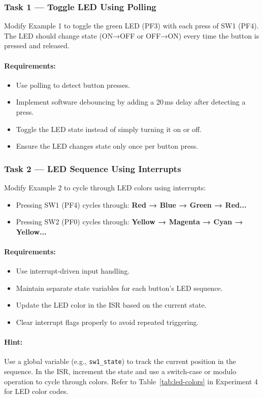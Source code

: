 \subsubsection{Task 1 — Toggle LED Using Polling}

Modify Example 1 to toggle the green LED (PF3) with each press of SW1 (PF4). The LED should change state (ON→OFF or OFF→ON) every time the button is pressed and released.

\paragraph{Requirements:}
\begin{itemize}[nosep]
  \item Use polling to detect button presses.
  \item Implement software debouncing by adding a 20\,ms delay after detecting a press.
  \item Toggle the LED state instead of simply turning it on or off.
  \item Ensure the LED changes state only once per button press.
\end{itemize}

\medskip


\subsubsection{Task 2 — LED Sequence Using Interrupts}

Modify Example 2 to cycle through LED colors using interrupts:
\begin{itemize}[nosep]
  \item Pressing SW1 (PF4) cycles through: \textbf{Red → Blue → Green → Red...}
  \item Pressing SW2 (PF0) cycles through: \textbf{Yellow → Magenta → Cyan → Yellow...}
\end{itemize}

\paragraph{Requirements:}
\begin{itemize}[nosep]
  \item Use interrupt-driven input handling.
  \item Maintain separate state variables for each button's LED sequence.
  \item Update the LED color in the ISR based on the current state.
  \item Clear interrupt flags properly to avoid repeated triggering.
\end{itemize}

\paragraph{Hint:}
Use a global variable (e.g., \texttt{sw1\_state}) to track the current position in the sequence. In the ISR, increment the state and use a switch-case or modulo operation to cycle through colors. Refer to Table~\ref{tab:led-colors} in Experiment 4 for LED color codes.